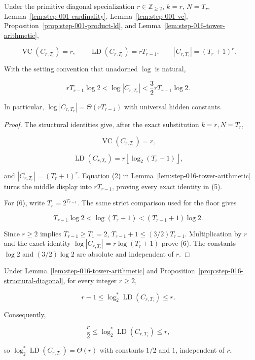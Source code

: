 \begin{proposition}\label{prop:step-016-structural-diagonal}
Under the primitive diagonal specialization \(r\in\mathbb Z_{\ge2}\),
\(k=r\), \(N=T_r\), Lemma~\ref{lem:step-001-cardinality}, Lemma~\ref{lem:step-001-vc}, Proposition~\ref{prop:step-001-product-ld}, and
Lemma~\ref{lem:step-016-tower-arithmetic},

\[
\operatorname{VC}(C_{r,T_r})=r,
\qquad
\operatorname{LD}(C_{r,T_r})=rT_{r-1},
\qquad
|C_{r,T_r}|=(T_r+1)^r.
\tag{5}
\]

With the setting convention that unadorned \(\log\) is natural,

\[
rT_{r-1}\log2
  <\log|C_{r,T_r}|
  <\frac32rT_{r-1}\log2.
\tag{6}
\]

In particular,
\(\log|C_{r,T_r}|=\Theta(rT_{r-1})\) with universal hidden constants.
\end{proposition}

\begin{proof}
The structural identities give, after the exact substitution
\(k=r,N=T_r\),

\[
\operatorname{VC}(C_{r,T_r})=r,
\]

\[
\operatorname{LD}(C_{r,T_r})
=r\left\lfloor\log_2(T_r+1)\right\rfloor,
\]

and \(|C_{r,T_r}|=(T_r+1)^r\). Equation (2) in
Lemma~\ref{lem:step-016-tower-arithmetic} turns the middle display into
\(rT_{r-1}\), proving every exact identity in (5).

For (6), write \(T_r=2^{T_{r-1}}\). The same strict comparison used for
the floor gives

\[
T_{r-1}\log2
  <\log(T_r+1)
  <(T_{r-1}+1)\log2.
\]

Since \(r\ge2\) implies \(T_{r-1}\ge T_1=2\),
\(T_{r-1}+1\le(3/2)T_{r-1}\). Multiplication by \(r\) and the exact
identity \(\log|C_{r,T_r}|=r\log(T_r+1)\) prove (6). The constants
\(\log2\) and \((3/2)\log2\) are absolute and independent of \(r\).
\end{proof}

\begin{lemma}\label{lem:step-016-ld-logstar}
Under Lemma~\ref{lem:step-016-tower-arithmetic} and
Proposition~\ref{prop:step-016-structural-diagonal}, for every integer
\(r\ge2\),

\[
r-1
\le
\log_2^*\operatorname{LD}(C_{r,T_r})
\le r.
\tag{7}
\]

Consequently,

\[
\frac r2
\le
\log_2^*\operatorname{LD}(C_{r,T_r})
\le r,
\tag{8}
\]

so \(\log_2^*\operatorname{LD}(C_{r,T_r})=\Theta(r)\) with constants
\(1/2\) and \(1\), independent of \(r\).
\end{lemma}

